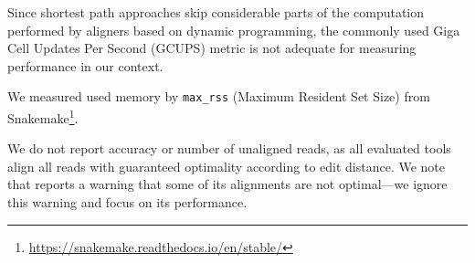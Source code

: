 Since shortest path approaches skip considerable parts of the computation
performed by aligners based on dynamic programming, the commonly used Giga Cell
Updates Per Second (GCUPS) metric is not adequate for measuring performance in
our context. 

We measured used memory by \texttt{max\_rss} (Maximum Resident Set Size) from
Snakemake\footnote{\url{https://snakemake.readthedocs.io/en/stable/}}.

We do not report accuracy or number of unaligned reads, as all evaluated
tools align all reads with guaranteed optimality according to edit distance. 
%
We note that \vargas reports a warning that some of its alignments are not
optimal---we ignore this warning and focus on its performance.
